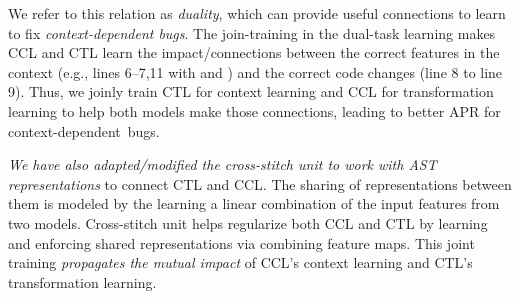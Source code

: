 



We refer to this relation as {\em duality}, which can provide useful
connections to learn to fix {\em context-dependent
  bugs}.
The join-training in the dual-task learning makes CCL and CTL learn
the impact/connections between the correct features in the context
(e.g., lines 6--7,11 with  and )
and the correct code changes (line 8 to line 9). Thus, we
joinly train CTL for context learning and CCL for transformation
learning to help both models make those connections, leading to better
APR for context-dependent~bugs.


{\em We have also adapted/modified the cross-stitch
    unit \cite{misra2016cross} to work with AST representations} to
connect CTL and CCL. The sharing of representations between them is
modeled by the learning a linear combination of the input features
from two models. Cross-stitch unit helps regularize both CCL and CTL
by learning and enforcing shared representations via combining feature
maps.
This joint training {\em propagates the mutual impact} of
CCL's context learning and CTL's transformation learning.

